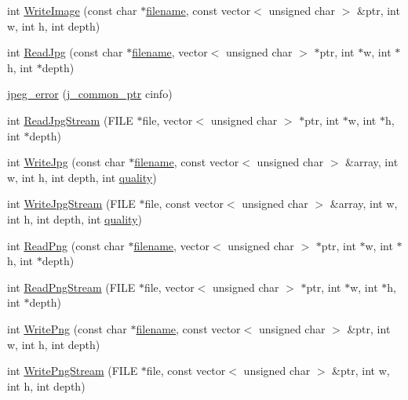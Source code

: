 \begin{DoxyCompactItemize}
\item 
int \hyperlink{namespacelibs_a5a6ca9606546052cbf2f57eb2569a7a6}{Write\+Image} (const char $\ast$\hyperlink{cdjpeg_8h_a47b60f696fdf746577cdf42ed791c264}{filename}, const vector$<$ unsigned char $>$ \&ptr, int w, int h, int depth)
\item 
int \hyperlink{namespacelibs_a20d071ac9b7e93b2c73fea6c5cb82ecf}{Read\+Jpg} (const char $\ast$\hyperlink{cdjpeg_8h_a47b60f696fdf746577cdf42ed791c264}{filename}, vector$<$ unsigned char $>$ $\ast$ptr, int $\ast$w, int $\ast$h, int $\ast$depth)
\item 
\hyperlink{namespacelibs_ae3d9972f22717e1b37bfb1c1bb4ff9ce}{jpeg\+\_\+error} (\hyperlink{jpeglib_8h_a1a177ab705cefea8f30ec31a48e62650}{j\+\_\+common\+\_\+ptr} cinfo)
\item 
int \hyperlink{namespacelibs_a78d4f9dec931d81700309eb2f55e0524}{Read\+Jpg\+Stream} (F\+I\+L\+E $\ast$file, vector$<$ unsigned char $>$ $\ast$ptr, int $\ast$w, int $\ast$h, int $\ast$depth)
\item 
int \hyperlink{namespacelibs_ae167e9755ed191d274866519b1f1f0f3}{Write\+Jpg} (const char $\ast$\hyperlink{cdjpeg_8h_a47b60f696fdf746577cdf42ed791c264}{filename}, const vector$<$ unsigned char $>$ \&array, int w, int h, int depth, int \hyperlink{jpeglib_8h_acac7df77df55f2a1bfd8d8d18340b773}{quality})
\item 
int \hyperlink{namespacelibs_ac031313b64f4a38adfd703fb1fcf84a0}{Write\+Jpg\+Stream} (F\+I\+L\+E $\ast$file, const vector$<$ unsigned char $>$ \&array, int w, int h, int depth, int \hyperlink{jpeglib_8h_acac7df77df55f2a1bfd8d8d18340b773}{quality})
\item 
int \hyperlink{namespacelibs_aef3395c9397fc7be44b6f7fb79220b94}{Read\+Png} (const char $\ast$\hyperlink{cdjpeg_8h_a47b60f696fdf746577cdf42ed791c264}{filename}, vector$<$ unsigned char $>$ $\ast$ptr, int $\ast$w, int $\ast$h, int $\ast$depth)
\item 
int \hyperlink{namespacelibs_afc37a774666cd905d9fd7e46628feb35}{Read\+Png\+Stream} (F\+I\+L\+E $\ast$file, vector$<$ unsigned char $>$ $\ast$ptr, int $\ast$w, int $\ast$h, int $\ast$depth)
\item 
int \hyperlink{namespacelibs_a21882f6f7752c1720a05412cb3e8b4bc}{Write\+Png} (const char $\ast$\hyperlink{cdjpeg_8h_a47b60f696fdf746577cdf42ed791c264}{filename}, const vector$<$ unsigned char $>$ \&ptr, int w, int h, int depth)
\item 
int \hyperlink{namespacelibs_a0a38559601a8a00a5fa2500a2fb35d70}{Write\+Png\+Stream} (F\+I\+L\+E $\ast$file, const vector$<$ unsigned char $>$ \&ptr, int w, int h, int depth)

\end{DoxyCompactItemize}
